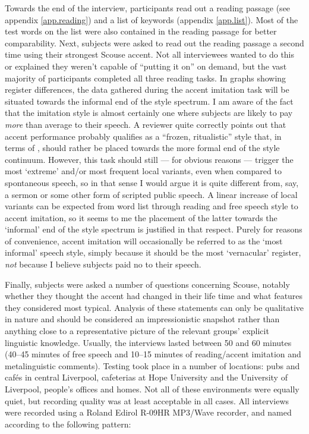 Towards the end of the interview, participants read out a reading passage (see appendix \ref{app.reading}) and a list of keywords (appendix \ref{app.list}).
Most of the test words on the list were also contained in the reading passage for better comparability.
Next, subjects were asked to read out the reading passage a second time using their strongest Scouse accent. Not all interviewees wanted to do this or explained they weren't capable of ``putting it on'' on demand, but the vast majority of participants completed all three reading tasks.
In graphs showing register differences, the data gathered during the accent imitation task will be situated towards the informal end of the style spectrum.
I am aware of the fact that the imitation style is almost certainly one where subjects are likely to pay \emph{more} than average  to their speech.
A reviewer quite correctly points out that accent performance probably qualifies as a \enquote{frozen, ritualistic} style \parencite{labov1972} that, in terms of , should rather be placed towards the more formal end of the style continuum.
However, this task should still --- for obvious reasons --- trigger the most \enquote*{extreme} and/or most frequent local variants, even when compared to spontaneous speech, so in that sense I would argue it is quite different from, say, a sermon or some other form of scripted public speech.
A linear increase of local variants can be expected from word list through reading and free speech style to accent imitation, so it seems to me the placement of the latter towards the \enquote*{informal} end of the style spectrum is justified in that respect.
Purely for reasons of convenience, accent imitation will occasionally be referred to as the \enquote*{most informal} speech style, simply because it should be the most \enquote*{vernacular} register, \emph{not} because I believe subjects paid no  to their speech.

Finally, subjects were asked a number of questions concerning Scouse, notably whether they thought the accent had changed in their life time and what features they considered most typical.
Analysis of these statements can only be qualitative in nature and should be considered an impressionistic snapshot rather than anything close to a representative picture of the relevant groups' explicit linguistic knowledge. Usually, the interviews lasted between 50 and 60 minutes (40--45 minutes of free speech and 10--15 minutes of reading/accent imitation and metalinguistic comments).
Testing took place in a number of locations: pubs and cafés in central Liverpool, cafeterias at Hope University and the University of Liverpool, people's offices and homes.
Not all of these environments were equally quiet, but recording quality was at least acceptable in all cases. All interviews were recorded using a Roland Edirol R-09HR MP3/Wave recorder, and named according to the following pattern:

